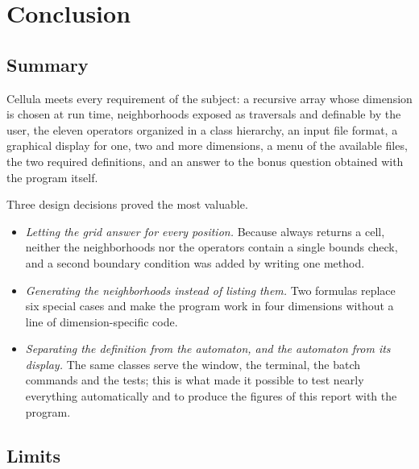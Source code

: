 \section{Conclusion}
\label{sec:conclusion}

\subsection{Summary}

Cellula meets every requirement of the subject: a recursive array whose dimension is chosen at
run time, neighborhoods exposed as traversals and definable by the user, the eleven operators
organized in a class hierarchy, an input file format, a graphical display for one, two and more
dimensions, a menu of the available files, the two required definitions, and an answer to the
bonus question obtained with the program itself.

Three design decisions proved the most valuable.

\begin{itemize}
    \item \emph{Letting the grid answer for every position.} Because  always
          returns a cell, neither the neighborhoods nor the operators contain a single bounds check,
          and a second boundary condition was added by writing one method.
    \item \emph{Generating the neighborhoods instead of listing them.} Two formulas replace six
          special cases and make the program work in four dimensions without a line of
          dimension-specific code.
    \item \emph{Separating the definition from the automaton, and the automaton from its display.}
          The same classes serve the window, the terminal, the batch commands and the tests; this is
          what made it possible to test nearly everything automatically and to produce the figures of
          this report with the program.
\end{itemize}

\subsection{Limits}

